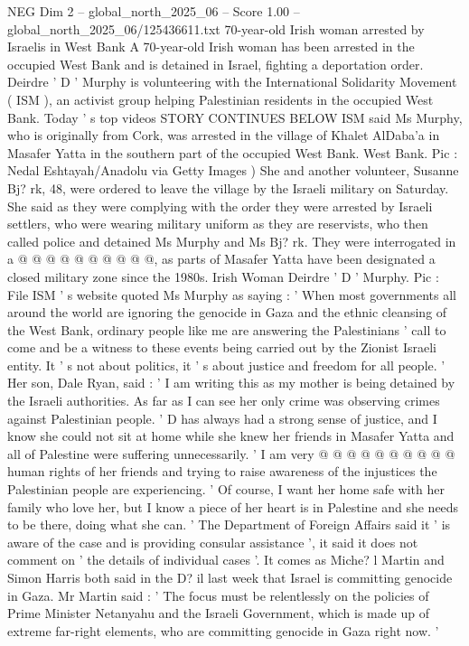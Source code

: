 \begin{textsample}{NEG Dim 2 – global\_north\_2025\_06 – Score 1.00 – global\_north\_2025\_06/125436611.txt}  \label{ex:f2_neg_227}
70-year-old Irish woman arrested by Israelis in West Bank A 70-year-old Irish woman has been arrested in the occupied West Bank and is detained in Israel, fighting a deportation order.
Deirdre ' D ' Murphy is volunteering with the International Solidarity Movement ( ISM ), an activist group helping Palestinian residents in the occupied West Bank.
Today ' s top videos STORY CONTINUES BELOW ISM said Ms Murphy, who is originally from Cork, was arrested in the village of Khalet AlDaba'a in Masafer Yatta in the southern part of the occupied West Bank.
West Bank.
Pic : Nedal Eshtayah/Anadolu via Getty Images ) She and another volunteer, Susanne Bj? rk, 48, were ordered to leave the village by the Israeli military on Saturday.
She said as they were complying with the order they were arrested by Israeli settlers, who were wearing military uniform as they are reservists, who then called police and detained Ms Murphy and Ms Bj? rk.
They were interrogated in a @ @ @ @ @ @ @ @ @ @, as parts of Masafer Yatta have been designated a closed military zone since the 1980s.
Irish Woman Deirdre ' D ' Murphy.
Pic : File ISM ' s website quoted Ms Murphy as saying : ' When most governments all around the world are ignoring the genocide in Gaza and the ethnic cleansing of the West Bank, ordinary people like me are answering the Palestinians ' call to come and be a witness to these events being carried out by the Zionist Israeli entity.
It ' s not about politics, it ' s about justice and freedom for all people. ' Her son, Dale Ryan, said : ' I am writing this as my mother is being detained by the Israeli authorities.
As far as I can see her only crime was observing crimes against Palestinian people. ' D has always had a strong sense of justice, and I know she could not sit at home while she knew her friends in Masafer Yatta and all of Palestine were suffering unnecessarily. ' I am very @ @ @ @ @ @ @ @ @ @ human rights of her friends and trying to raise awareness of the injustices the Palestinian people are experiencing. ' Of course, I want her home safe with her family who love her, but I know a piece of her heart is in Palestine and she needs to be there, doing what she can. ' The Department of Foreign Affairs said it ' is aware of the case and is providing consular assistance ', it said it does not comment on ' the details of individual cases '.
It comes as Miche? l Martin and Simon Harris both said in the D? il last week that Israel is committing genocide in Gaza.
Mr Martin said : ' The focus must be relentlessly on the policies of Prime Minister Netanyahu and the Israeli Government, which is made up of extreme far-right elements, who are committing genocide in Gaza right now. '

\end{textsample}
